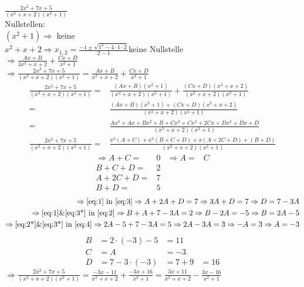 \documentclass[11pt,a4paper]{article}
\begin{document}
    $\frac{2x^2 + 7x + 5}{\left( x^2 + x + 2\right)\left( x^2 +1 \right)}$\\
    Nullstellen:\\
    $\left(x^2+1\right)\Rightarrow$ keine\\
    $x^2+x+2 \Rightarrow x_{1,2} = \frac{-1\pm\sqrt{1^2-4\cdot1\cdot2}}{2-1}$\qquad\Lightning keine Nullstelle\\
    $\Rightarrow \frac{Ax+B}{4x^2+x+2} + \frac{Cx+D}{x^2+1}$\\
    $\Rightarrow \frac{2x^2+7x+5}{\left(x^2+x+2\right)\left(x^2+1\right)} = \frac{Ax+B}{x^2+x+2} + \frac{Cx+D}{x^2+1}$
    \begin{align*}
      \frac{2x^2+7x+5}{\left(x^2+x+2\right)\left(x^2+1\right)} =& \frac{\left(Ax+B\right)\left(x^2+1\right)}{\left(x^2+x+2\right)\left(x^2+1\right)} + \frac{\left(Cx+D\right)\left(x^2+x+2\right)}{\left(x^2+x+2\right)\left(x^2+1\right)}\\
      =& \frac{\left(Ax+B\right)\left(x^2+1\right) + \left(Cx + D\right)\left(x^2+x+2\right)}{\left(x^2+x+2\right)\left(x^2+1\right)}\\
      =& \frac{Ax^3+Ax+Bx^2+B+Cx^3+Cx^2+2Cx+Dx^2+Dx+D}{\left(x^2+x+2\right)\left(x^2+1\right)}\\
    \frac{2x^2+7x+5}{\left(x^2+x+2\right)\left(x^2+1\right)} =& \frac{x^3\left(A+C\right)+x^2\left(B+C+D\right)+x\left(A+2C+D\right)+\left(B+D\right)}{\left(x^2+x+2\right)\left(x^2+1\right)}
    \end{align*}
    \begin{align}
      \Rightarrow A+C=&0 & \Rightarrow A=&C \label{eq:1}\\
      B+C+D=&2 \label{eq:2}\\
      A+2C+D=&7 \label{eq:3}\\
      B+D=&5 \label{eq:4}
    \end{align}
    \begin{align}
      \Rightarrow \eqref{eq:1} \text{ in } \eqref{eq:3} \Rightarrow A+2A+D=7 \Rightarrow 3A+D=7 \Rightarrow D=7-3A \label{eq:3*}\\
      \Rightarrow \eqref{eq:1} \& \eqref{eq:3*} \text{ in } \eqref{eq:2} \Rightarrow B+A+7-3A=2 \Rightarrow B-2A=-5 \Rightarrow B=2A-5 \label{eq:2*}\\
      \Rightarrow \eqref{eq:2*} \& \eqref{eq:3*} \text{ in } \eqref{eq:4} \Rightarrow 2A-5+7-3A=5 \Rightarrow 2A-3A=3 \Rightarrow -A=3 \Rightarrow A=-3
    \end{align}
    \begin{align*}
      B&=2\cdot \left(-3\right)-5 &= 11\\
      C&=A&=-3\\
      D&=7-3\cdot\left(-3\right) &=7+9 &=16
    \end{align*}
      $\Rightarrow \frac{2x^2+7x+5}{\left(x^2+x+2\right)\left(x^2+1\right)}=\frac{-3x-11}{x^2+x+2}+\frac{-3x+16}{x^2+1}=\frac{3x+11}{x^2+x+2}-\frac{3x-16}{x^2+1}$
\end{document}

